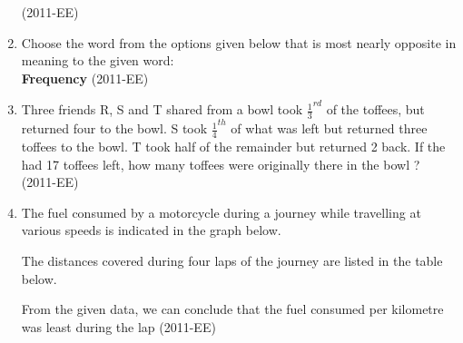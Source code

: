 \documentclass[journal]{IEEEtran}
\begin{document}
\begin{enumerate}
\hfill(2011-EE)
\begin{enumerate}
\end{enumerate}
\item Choose the word from the options given below that is most nearly opposite in meaning to the given word: \\
\textbf{Frequency} \hfill(2011-EE)
\begin{enumerate}
\end{enumerate}
\item Three friends R, S and T shared from a bowl took $\frac{1}{3}^{rd}$ of the toffees, but returned four to the bowl. S took $\frac{1}{4}^{th}$ of what was left but returned three toffees to the bowl. T took half of the remainder but returned 2 back. If the had 17 toffees left, how many toffees were originally there in the bowl ? \hfill(2011-EE)
	\begin{enumerate}
	\end{enumerate}
\item The fuel consumed by a motorcycle during a journey while travelling at various speeds is indicated in the graph below.
	\begin{figure}[H]
		\centering
		
		\caption{}
		\label{25}
	\end{figure}
	The distances covered during four laps of the journey are listed in the table below.
		
	From the given data, we can conclude that the fuel consumed per kilometre was least during the lap \hfill(2011-EE)

\end{enumerate}
\end{document}
